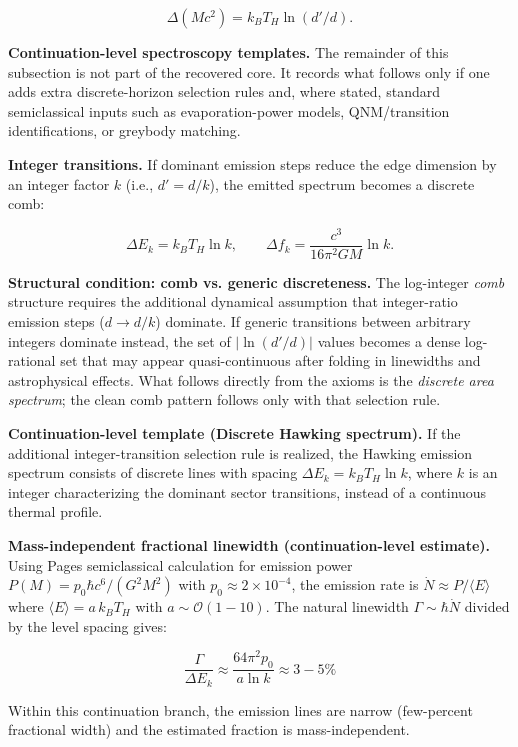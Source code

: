\[
\Delta(Mc^2) = k_B T_H \ln(d'/d).
\]

\textbf{Continuation-level spectroscopy templates.} The remainder of this subsection is not part of the recovered core. It records what follows only if one adds extra discrete-horizon selection rules and, where stated, standard semiclassical inputs such as evaporation-power models, QNM/transition identifications, or greybody matching.

\textbf{Integer transitions.} If dominant emission steps reduce the edge dimension by an integer factor \(k\) (i.e., \(d'=d/k\)), the emitted spectrum becomes a discrete comb:

\[
\Delta E_k = k_B T_H \ln k, \qquad
\Delta f_k = \frac{c^3}{16\pi^2 G M} \ln k.
\]

\textbf{Structural condition: comb vs. generic discreteness.} The log-integer \emph{comb} structure requires the additional dynamical assumption that integer-ratio emission steps (\(d \to d/k\)) dominate. If generic transitions between arbitrary integers dominate instead, the set of \(|\ln(d'/d)|\) values becomes a dense log-rational set that may appear quasi-continuous after folding in linewidths and astrophysical effects. What follows directly from the axioms is the \emph{discrete area spectrum}; the clean comb pattern follows only with that selection rule.

\textbf{Continuation-level template (Discrete Hawking spectrum).} If the additional integer-transition selection rule is realized, the Hawking emission spectrum consists of discrete lines with spacing \(\Delta E_k = k_B T_H \ln k\), where \(k\) is an integer characterizing the dominant sector transitions, instead of a continuous thermal profile.

\textbf{Mass-independent fractional linewidth (continuation-level estimate).} Using Page\textquotesingle s semiclassical calculation for emission power \(P(M) = p_0 \hbar c^6 / (G^2 M^2)\) with \(p_0 \approx 2 \times 10^{-4}\), the emission rate is \(\dot{N} \approx P /
\langle E \rangle\) where \(\langle E \rangle = a \, k_B T_H\) with \(a \sim
\mathcal{O}(1-10)\). The natural linewidth \(\Gamma \sim \hbar \dot{N}\) divided by the level spacing gives:

\[
\frac{\Gamma}{\Delta E_k} \approx \frac{64\pi^2 p_0}{a \ln k} \approx 3-5\%
\]

Within this continuation branch, the emission lines are narrow (few-percent fractional width) and the estimated fraction is mass-independent.

